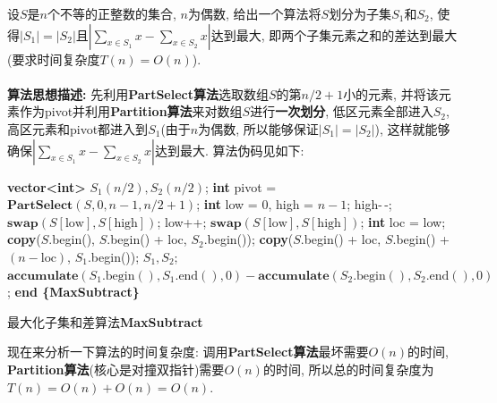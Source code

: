 \documentclass{article}
\begin{document}
\begin{homeworkProblem}
	设$S$是$n$个不等的正整数的集合, $n$为偶数, 给出一个算法将$S$划分为子集$S_1$和$S_2$, 使得$\left\lvert S_1\right\rvert =\left\lvert S_2\right\rvert $且$\displaystyle \left| \sum_{x\in S_1}{x}-\sum_{x\in S_2}{x} \right|$达到最大, 即两个子集元素之和的差达到最大 (要求时间复杂度$T(n)=O(n)$).
	\\

	\solution
	\\
	
	\textbf{算法思想描述:} 先利用\textbf{PartSelect算法}选取数组$S$的第$n/2+1$小的元素, 并将该元素作为pivot并利用\textbf{Partition算法}来对数组$S$进行\textbf{一次划分}, 低区元素全部进入$S_2$, 高区元素和pivot都进入到$S_1$(由于$n$为偶数, 所以能够保证$\left| S_1 \right|=\left| S_2 \right|$), 这样就能够确保$\displaystyle \left| \sum_{x\in S_1}{x}-\sum_{x\in S_2}{x} \right|$达到最大. 
	算法伪码见如下:
	\begin{algorithm}[H]
		\begin{algorithmic}[1]
		 
		\State \textbf{vector<int>} $S_1(n/2),S_2(n/2)$;
		\State \textbf{int} pivot = $\textbf{PartSelect}\left( S,0,n-1,n/2+1 \right)$; 
		\State \textbf{int} low = 0, high = $n-1$; 
				\State high-\,-;
			\EndWhile
			\State $\textbf{swap}(S[\text{low}], S[\text{high}])$;
				\State low++;
			\EndWhile
			\State $\textbf{swap}(S[\text{low}], S[\text{high}])$;
		\EndWhile
		\State \textbf{int} loc = low; 
		\State \textbf{copy}($S$.begin(), $S$.begin() + loc, $S_2$.begin()); 
		\State \textbf{copy}($S$.begin() + loc, $S$.begin() + $(n - \text{loc})$, $S_1$.begin()); 
		\State \Return $S_1,S_2$; 
		\State \Return $\textbf{accumulate}(S_1.\text{begin}(), S_1.\text{end}(), 0)-\textbf{accumulate}(S_2.\text{begin}(), S_2.\text{end}(), 0)$;
		\State \textbf{end \{MaxSubtract\}}
		\end{algorithmic}
		\caption{最大化子集和差算法\textbf{MaxSubtract}}
		\label{alg:最大化子集和差算法}
	\end{algorithm}

	现在来分析一下算法的时间复杂度: 调用\textbf{PartSelect算法}最坏需要$O(n)$的时间, \textbf{Partition算法}(核心是对撞双指针)需要$O(n)$的时间, 所以总的时间复杂度为$T(n)=O(n)+O(n)=O(n)$.
\end{homeworkProblem}
\end{document}
